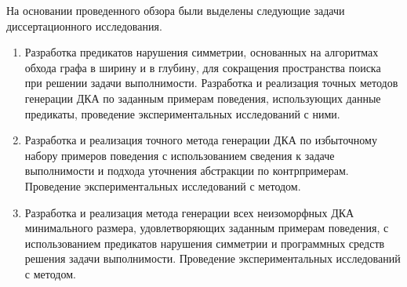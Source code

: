 На основании проведенного обзора были выделены следующие задачи диссертационного исследования.
\begin{enumerate}
  \item Разработка предикатов нарушения симметрии, основанных на алгоритмах обхода графа в ширину и в глубину, для сокращения пространства поиска при решении задачи выполнимости.
  Разработка и реализация точных методов генерации ДКА по заданным примерам поведения, использующих данные предикаты, проведение экспериментальных исследований с ними.

  \item Разработка и реализация точного метода генерации ДКА по избыточному набору примеров поведения с использованием сведения к задаче выполнимости и подхода уточнения абстракции по контрпримерам.
  Проведение экспериментальных исследований с методом.
  
  \item Разработка и реализация метода генерации всех неизоморфных ДКА минимального размера, удовлетворяющих заданным примерам поведения, с использованием предикатов нарушения симметрии и программных средств решения задачи выполнимости.
  Проведение экспериментальных исследований с методом.
\end{enumerate}


\chresults{\ref{sec:review}}